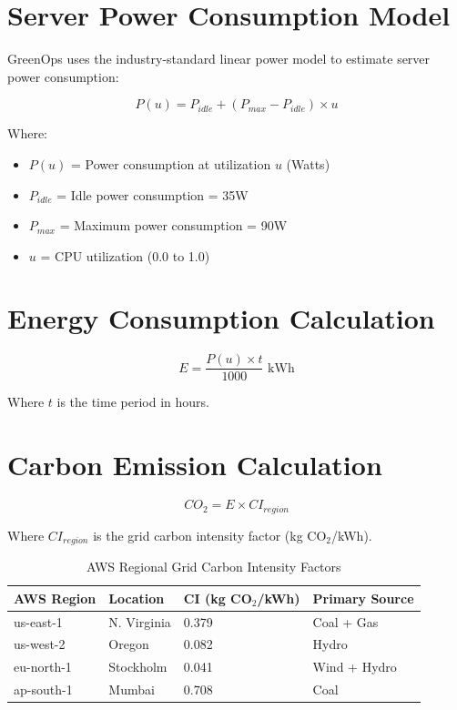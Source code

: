 \documentclass[12pt,a4paper]{report}
\begin{document}
\section{Server Power Consumption Model}

GreenOps uses the industry-standard linear power model to estimate server power consumption:

\begin{equation}
P(u) = P_{idle} + (P_{max} - P_{idle}) \times u
\end{equation}

Where:
\begin{itemize}
    \item $P(u)$ = Power consumption at utilization $u$ (Watts)
    \item $P_{idle}$ = Idle power consumption = 35W
    \item $P_{max}$ = Maximum power consumption = 90W
    \item $u$ = CPU utilization (0.0 to 1.0)
\end{itemize}

\section{Energy Consumption Calculation}

\begin{equation}
E = \frac{P(u) \times t}{1000} \text{ kWh}
\end{equation}

Where $t$ is the time period in hours.

\section{Carbon Emission Calculation}

\begin{equation}
CO_2 = E \times CI_{region}
\end{equation}

Where $CI_{region}$ is the grid carbon intensity factor (kg CO$_2$/kWh).

\begin{table}[H]
\centering
\caption{AWS Regional Grid Carbon Intensity Factors}
\begin{tabular}{@{}llll@{}}
\toprule
\textbf{AWS Region} & \textbf{Location} & \textbf{CI (kg CO$_2$/kWh)} & \textbf{Primary Source} \\
\midrule
us-east-1 & N. Virginia & 0.379 & Coal + Gas \\
us-west-2 & Oregon & 0.082 & Hydro \\
eu-north-1 & Stockholm & 0.041 & Wind + Hydro \\
ap-south-1 & Mumbai & 0.708 & Coal \\
\bottomrule
\end{tabular}
\end{table}
\end{document}
